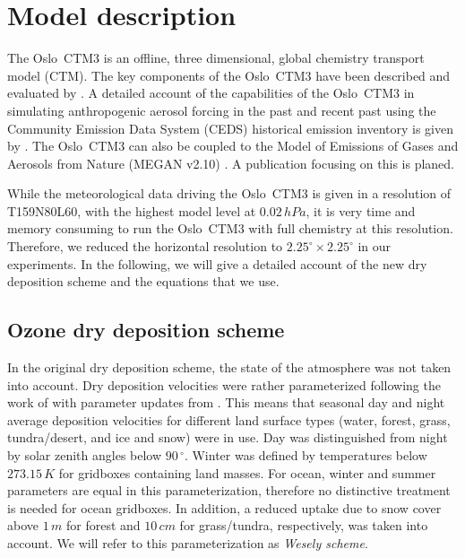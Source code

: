 \documentclass[gmd, manuscript]{copernicus}
\begin{document}
\section{Model description}
\label{sec:model_des}
The Oslo~CTM3 is an offline, three dimensional, global chemistry transport model (CTM). The key components of the Oslo~CTM3 have been described and evaluated by \citet{GMD:Sovde2012}. A detailed account of the capabilities of the Oslo~CTM3 in simulating anthropogenic aerosol forcing in the past and recent past using the Community Emission Data System (CEDS) historical emission inventory \citep{GMD:Hoesly2018} is given by \citet{GMD:Lund2018}. The Oslo~CTM3 can also be coupled to the Model of Emissions of Gases and Aerosols from Nature (MEGAN v2.10) \citep{ACP:Guenther2006}. A publication focusing on this is planed.

While the meteorological data driving the Oslo~CTM3 is given in a resolution of T159N80L60, with the highest model level at $0.02\,\unit{hPa}$, it is very time and memory consuming to run the Oslo~CTM3 with full chemistry at this resolution. Therefore, we reduced the horizontal resolution to $2.25^\circ\times2.25^\circ$ in our experiments. In the following, we will give a detailed account of the new dry deposition scheme and the equations that we use.
\subsection{Ozone dry deposition scheme}
\label{subsec:DryDep}
In the original dry deposition scheme, the state of the atmosphere was not taken into account. Dry deposition velocities were rather parameterized following the work of \citet{AE:Wesely1989} with parameter updates from \citet{JGR:Hough1991}. This means that seasonal day and night average deposition velocities for different land surface types (water, forest, grass, tundra/desert, and ice and snow) were in use. Day was distinguished from night by solar zenith angles below $90\,\unit{^\circ}$. Winter was defined by temperatures below $273.15\,\unit{K}$ for gridboxes containing land masses. For ocean, winter and summer parameters are equal in this parameterization, therefore no distinctive treatment is needed for ocean gridboxes. In addition, a reduced uptake due to snow cover above $1\,\unit{m}$ for forest and $10\,\unit{cm}$ for grass/tundra, respectively, was taken into account. We will refer to this parameterization as \emph{Wesely scheme}.\\
\end{document}
